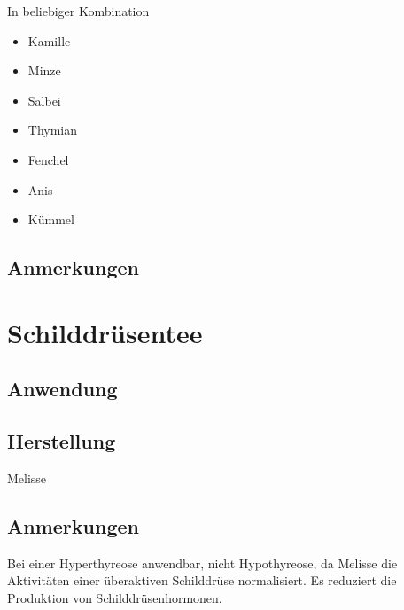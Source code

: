In beliebiger Kombination

\begin{itemize}
	\item Kamille
	\item Minze
	\item Salbei
	\item Thymian
	\item Fenchel
	\item Anis
	\item Kümmel
\end{itemize}

\subsection{Anmerkungen}





\section{Schilddrüsentee}

\subsection{Anwendung}

\subsection{Herstellung}

Melisse

\subsection{Anmerkungen}

Bei einer Hyperthyreose anwendbar, nicht Hypothyreose, da Melisse die Aktivitäten einer überaktiven Schilddrüse normalisiert. Es reduziert die Produktion von Schilddrüsenhormonen.








